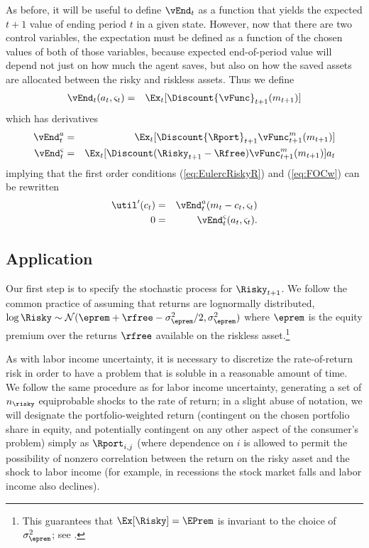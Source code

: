\documentclass[titlepage]{\econtex}
\begin{document}
As before, it will be useful to define $\vEnd_{t}$ as a function that
yields the expected $t+1$ value of ending period $t$ in a given state.
However, now that there are two control variables, the expectation
must be defined as a function of the chosen values of both of those
variables, because expected end-of-period value will depend not just
on how much the agent saves, but also on how the saved assets are
allocated between the risky and riskless assets.  Thus we define
\begin{eqnarray*}
        \vEnd_{t}({a}_{t},\varsigma_{t}) & = & \Ex_{t}[\Discount {\vFunc}_{t+1}({m}_{t+1})]
\end{eqnarray*}
which has derivatives
\begin{eqnarray*}
        \vEnd_{t}^{{a}} & = & \Ex_{t}[\Discount {\Rport}_{t+1}{\vFunc}_{t+1}^{m}({m}_{t+1})]
\\      \vEnd_{t}^{\varsigma} & = & \Ex_{t}[\Discount (\Risky_{t+1}-\Rfree){\vFunc}_{t+1}^{m}({m}_{t+1})  ]a_{t}
\end{eqnarray*}
implying that the first order conditions (\ref{eq:EulercRiskyR}) and
(\ref{eq:FOCw}) can be rewritten
\begin{eqnarray}
        \util^{\prime}({c}_{t}) & = & \vEnd_{t}^{{a}}({m}_{t}-{c}_{t},\varsigma_{t})
\\      0 & = & \vEnd^{\varsigma}_{t}({a}_{t},\varsigma_{t}).
\end{eqnarray}

\subsection{Application}

Our first step is to specify the stochastic process for $\Risky_{t+1}$.
We follow the common practice of assuming that returns are
lognormally distributed, $\log \Risky \sim
\mathcal{N}(\eprem+\rfree-\sigma^{2}_{\eprem}/2,\sigma^{2}_{\eprem})$ where $\eprem$ is the equity premium
over the returns $\rfree$ available on the riskless asset.\footnote{This guarantees that $\Ex[\Risky] = \EPrem$ is invariant to the choice of $\sigma^{2}_{\eprem}$; see .}

As with labor income uncertainty, it is necessary to discretize the
rate-of-return risk in order to have a problem that is soluble in a
reasonable amount of time.  We follow the same procedure as for labor
income uncertainty, generating a set of $n_{\risky}$ equiprobable shocks to the
rate of return; in a slight abuse of notation, we will designate
the portfolio-weighted return (contingent on the
chosen portfolio share in equity, and potentially contingent on any other
aspect of the consumer's problem) simply as $\Rport_{i,j}$ (where dependence
on $i$ is allowed to permit the possibility of nonzero correlation
between the return on the risky asset and the shock to labor income (for example,
in recessions the stock market falls and labor income also declines).
\end{document}
